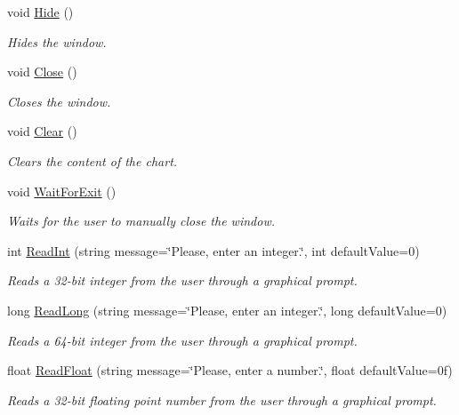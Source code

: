 \begin{DoxyCompactItemize}
void \mbox{\hyperlink{class_s_g_l_1_1_graph_ad01766cdde14e9f9bcae84caa9d5351d}{Hide}} ()
\begin{DoxyCompactList}\small\item\em Hides the window. \end{DoxyCompactList}\item 
void \mbox{\hyperlink{class_s_g_l_1_1_graph_ab39ea13f352304658601da75c8207b08}{Close}} ()
\begin{DoxyCompactList}\small\item\em Closes the window. \end{DoxyCompactList}\item 
void \mbox{\hyperlink{class_s_g_l_1_1_graph_ad1f5ca5a92e9a3c788178e44d65ba005}{Clear}} ()
\begin{DoxyCompactList}\small\item\em Clears the content of the chart. \end{DoxyCompactList}\item 
void \mbox{\hyperlink{class_s_g_l_1_1_graph_a6b99d7fed85538b0dd5906e359fcf9c0}{Wait\+For\+Exit}} ()
\begin{DoxyCompactList}\small\item\em Waits for the user to manually close the window. \end{DoxyCompactList}\item 
int \mbox{\hyperlink{class_s_g_l_1_1_graph_a4162119a26ba960884e3660c0750d14c}{Read\+Int}} (string message=\char`\"{}Please, enter an integer.\char`\"{}, int default\+Value=0)
\begin{DoxyCompactList}\small\item\em Reads a 32-\/bit integer from the user through a graphical prompt. \end{DoxyCompactList}\item 
long \mbox{\hyperlink{class_s_g_l_1_1_graph_aa55701744ab9d06019ff60e4d2da0a16}{Read\+Long}} (string message=\char`\"{}Please, enter an integer.\char`\"{}, long default\+Value=0)
\begin{DoxyCompactList}\small\item\em Reads a 64-\/bit integer from the user through a graphical prompt. \end{DoxyCompactList}\item 
float \mbox{\hyperlink{class_s_g_l_1_1_graph_aa9d57659823175542533c9cceeeb1ff6}{Read\+Float}} (string message=\char`\"{}Please, enter a number.\char`\"{}, float default\+Value=0f)
\begin{DoxyCompactList}\small\item\em Reads a 32-\/bit floating point number from the user through a graphical prompt. \end{DoxyCompactList}\item 

\end{DoxyCompactItemize}
